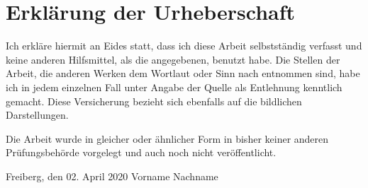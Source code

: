 \chapter*{Erklärung der Urheberschaft}
Ich erkläre hiermit an Eides statt, dass ich diese Arbeit selbstständig
verfasst und keine anderen Hilfsmittel, als die angegebenen, benutzt habe. Die Stellen der Arbeit, die anderen Werken dem Wortlaut oder Sinn nach entnommen sind, habe ich in jedem einzelnen Fall unter Angabe der Quelle als Entlehnung kenntlich gemacht. Diese Versicherung bezieht sich ebenfalls auf die bildlichen Darstellungen.

Die Arbeit wurde in gleicher oder ähnlicher Form in bisher keiner anderen Prüfungsbehörde vorgelegt und auch noch nicht veröffentlicht.

\vspace{4cm}

\hspace{0pt} Freiberg, den 02. April 2020  \hfill Vorname Nachname \hspace{1cm}
